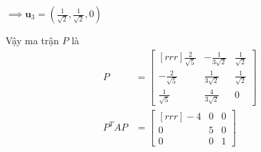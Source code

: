 \documentclass{article}
\newcommand\ddfrac[2]{\frac{\displaystyle #1}{\displaystyle #2}}
\begin{document}
\begin{minipage}[t]{0.48\linewidth}
    $\implies \textbf{u}_3 = \left( \ddfrac{1}{\sqrt{2}} ,  \ddfrac{1}{\sqrt{2}}, 0 \right)$

    Vậy ma trận $P$ là 
    \begin{equation*}
        \begin{split}
            P &= \begin{bmatrix}[rrr]
                \ddfrac{2}{\sqrt{5}} & - \ddfrac{1}{3\sqrt{2}} & \ddfrac{1}{\sqrt{2}}  \\
                - \ddfrac{2}{\sqrt{5}}  & \ddfrac{1}{3\sqrt{2}} & \ddfrac{1}{\sqrt{2}} \\
                \ddfrac{1}{\sqrt{5}} & \ddfrac{4}{3\sqrt{2}} & 0 
            \end{bmatrix} \\
                P^TAP &= \begin{bmatrix}[rrr]
                    -4 & 0 & 0 \\
                    0 & 5 & 0 \\
                    0 & 0 & 1 
                \end{bmatrix} 
        \end{split}
    \end{equation*}

    \end{minipage}


  
\end{document}
